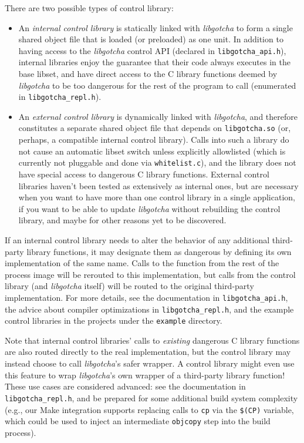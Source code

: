 \documentclass[12pt,letterpaper]{book}
\newcommand{\whitelist}[1][\xspace]{allowlist#1}
\begin{document}
There are two possible types of control library:
\begin{itemize}
\item An \textit{internal control library} is statically linked with \textit{libgotcha} to form a single shared
   object file that is loaded (or preloaded) as one unit.  In addition to having access to the
   \textit{libgotcha} control API (declared in \texttt{libgotcha\_api.h}), internal libraries enjoy the guarantee
   that their code always executes in the base libset, and have direct access to the C library
   functions deemed by \textit{libgotcha} to be too dangerous for the rest of the program to call
   (enumerated in \texttt{libgotcha\_repl.h}).
\item An \textit{external control library} is dynamically linked with \textit{libgotcha}, and therefore constitutes
   a separate shared object file that depends on \texttt{libgotcha.so} (or, perhaps, a compatible internal
   control library).  Calls into such a library do not cause an automatic libset switch unless
   explicitly \whitelist{ed} (which is currently not pluggable and done via \texttt{whitelist.c}), and the
   library does not have special access to dangerous C library functions.  External control
   libraries haven't been tested as extensively as internal ones, but are necessary when you want to
   have more than one control library in a single application, if you want to be able to update
   \textit{libgotcha} without rebuilding the control library, and maybe for other reasons yet to be
   discovered.
\end{itemize}

If an internal control library needs to alter the behavior of any additional third-party library
functions, it may designate them as dangerous by defining its own implementation of the same name.
Calls to the function from the rest of the process image will be rerouted to this implementation,
but calls from the control library (and \textit{libgotcha} itself) will be routed to the original
third-party implementation.  For more details, see the documentation in \texttt{libgotcha\_api.h}, the
advice about compiler optimizations in \texttt{libgotcha\_repl.h}, and the example control libraries in the
projects under the \texttt{example} directory.

Note that internal control libraries' calls to \textit{existing} dangerous C library functions are also
routed directly to the real implementation, but the control library may instead choose to call
\textit{libgotcha}'s safer wrapper.  A control library might even use this feature to wrap \textit{libgotcha}'s
own wrapper of a third-party library function!  These use cases are considered advanced: see the
documentation in \texttt{libgotcha\_repl.h}, and be prepared for some additional build system complexity
(e.g., our Make integration supports replacing calls to \texttt{cp} via the \texttt{\$(CP)} variable, which could
be used to inject an intermediate \texttt{objcopy} step into the build process).
\end{document}
